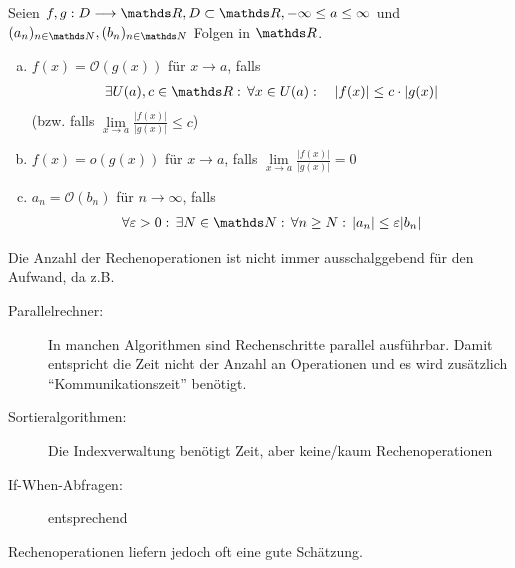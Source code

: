 \begin{Defe}
  Seien $f,g : D\longrightarrow \R, D\subset \R, -\infty\leq a\leq \infty$ und
  $(a_n)_{n\in\N}, (b_n)_{n\in\N}$ Folgen in $\R$.
  \begin{enumerate}[a)]
  \item $f(x) = \mathcal{O}(g(x))$ für $x\longrightarrow a$, falls
    \begin{gather*}
      \exists U(a), c\in\R:\, \forall x\in U(a) : \quad |f(x)| \leq c\cdot |g(x)|
    \end{gather*}
    (bzw. falls $\lim\limits_{x\rightarrow a}\frac{|f(x)|}{|g(x)|} \leq c$)
  \item $f(x) = o(g(x))$ für $x\longrightarrow a$, falls 
    $\lim\limits_{x\rightarrow a}\frac{|f(x)|}{|g(x)|} = 0$
  \item $a_n = \mathcal{O}(b_n)$ für $n\longrightarrow \infty$, falls
    \begin{gather*}
      \forall \varepsilon > 0 : \, \exists N\in\N : \, \forall n \geq N: \, |a_n| \leq \varepsilon |b_n|
    \end{gather*}
  \end{enumerate}
\end{Defe}

Die Anzahl der Rechenoperationen ist nicht immer ausschalggebend für den Aufwand, da
z.B.
\begin{description}
\item[Parallelrechner:] In manchen Algorithmen sind Rechenschritte parallel ausführbar.
  Damit entspricht die Zeit nicht der Anzahl an Operationen und es wird zusätzlich
  \enquote{Kommunikationszeit} benötigt.
\item[Sortieralgorithmen:] Die Indexverwaltung benötigt Zeit, aber keine/kaum Rechenoperationen
\item[If-When-Abfragen:] entsprechend
\end{description}
Rechenoperationen liefern jedoch oft eine gute Schätzung.


